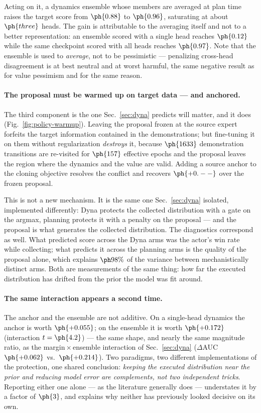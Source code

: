 Acting on it, a dynamics ensemble whose members are averaged at plan time raises
the target score from $\ph{0.88}$ to $\ph{0.96}$, saturating at about
$\ph{three}$ heads. The gain is attributable to the averaging itself and not to
a better representation: an ensemble scored with a single head reaches
$\ph{0.12}$ while the same checkpoint scored with all heads reaches
$\ph{0.97}$. Note that the ensemble is used to \emph{average}, not to be
pessimistic --- penalizing cross-head disagreement is at best neutral and at
worst harmful, the same negative result as for value pessimism and for the same
reason.

\paragraph{The proposal must be warmed up on target data --- and anchored.}
The third component is the one Sec.~\ref{sec:dyna} predicts will matter, and it
does (Fig.~\ref{fig:policy-warmup}). Leaving the proposal frozen at the source
expert forfeits the target information contained in the demonstrations; but
fine-tuning it on them without regularization \emph{destroys} it, because
$\ph{1633}$ demonstration transitions are re-visited for $\ph{157}$ effective
epochs and the proposal leaves the region where the dynamics and the value are
valid. Adding a source anchor to the cloning objective resolves the conflict and
recovers $\ph{+0.--}$ over the frozen proposal.

This is not a new mechanism. It is the same one Sec.~\ref{sec:dyna} isolated,
implemented differently: Dyna protects the collected distribution with a gate on
the argmax, planning protects it with a penalty on the proposal --- and the
proposal is what generates the collected distribution. The diagnostics
correspond as well. What predicted score across the Dyna arms was the actor's
win rate while collecting; what predicts it across the planning arms is the
quality of the proposal alone, which explains $\ph{98\%}$ of the variance
between mechanistically distinct arms. Both are measurements of the same thing:
how far the executed distribution has drifted from the prior the model was fit
around.

\paragraph{The same interaction appears a second time.}
The anchor and the ensemble are not additive. On a single-head dynamics the
anchor is worth $\ph{+0.055}$; on the ensemble it is worth $\ph{+0.172}$
(interaction $t=\ph{4.2}$) --- the same shape, and nearly the same magnitude
ratio, as the margin\,$\times$\,ensemble interaction of Sec.~\ref{sec:dyna}
($\Delta$AUC $\ph{+0.062}$ vs.\ $\ph{+0.214}$). Two paradigms, two different
implementations of the protection, one shared conclusion: \emph{keeping the
executed distribution near the prior and reducing model error are complements,
not two independent tricks}. Reporting either one alone --- as the literature
generally does --- understates it by a factor of $\ph{3}$, and explains why
neither has previously looked decisive on its own.

